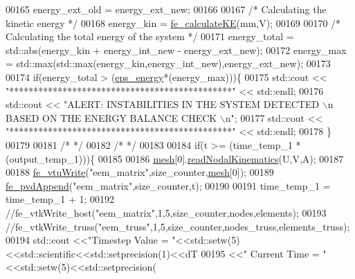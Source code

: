\begin{DoxyCode}
00165                 energy\_ext\_old = energy\_ext\_new;
00166 
00167                 \textcolor{comment}{/* Calculating the kinetic energy */}
00168                 energy\_kin = \hyperlink{functions_8h_afb8a8298008daf8f2e705a9acb72b984}{fe\_calculateKE}(mm,V);
00169 
00170                 \textcolor{comment}{/* Calculating the total energy of the system */}
00171                 energy\_total = std::abs(energy\_kin + energy\_int\_new - energy\_ext\_new);
00172                 energy\_max = std::max(std::max(energy\_kin,energy\_int\_new),energy\_ext\_new);
00173 
00174                 \textcolor{keywordflow}{if}(energy\_total > (\hyperlink{fe__main_e_x_p_l_i_c_i_t_8cpp_a33157279f223d2f4775b0d78b73bc08f}{eps\_energy}*(energy\_max)))\{
00175                     std::cout << \textcolor{stringliteral}{"**********************************************"} << std::endl;
00176                     std::cout << \textcolor{stringliteral}{"ALERT: INSTABILITIES IN THE SYSTEM DETECTED \(\backslash\)n BASED ON THE ENERGY
       BALANCE CHECK \(\backslash\)n"};
00177                     std::cout << \textcolor{stringliteral}{"**********************************************"} << std::endl;
00178                 \}
00179 
00181                 \textcolor{comment}{/* */}
00182                 \textcolor{comment}{/* */}
00183 
00184                 \textcolor{keywordflow}{if}(t >= (time\_temp\_1 * (output\_temp\_1)))\{
00185 
00186                     \hyperlink{_global_variables_8h_a6e08f89b32254fb4b129720418e7c6ea}{mesh}[0].\hyperlink{class_mesh_a2193a797388525febbac794d17bea23e}{readNodalKinematics}(U,V,A);
00187 
00188                     \hyperlink{functions_8h_a9c39148b76d7691ea87e7f2f88b02295}{fe\_vtuWrite}(\textcolor{stringliteral}{"eem\_matrix"},size\_counter,\hyperlink{_global_variables_8h_a6e08f89b32254fb4b129720418e7c6ea}{mesh}[0]);
00189                     \hyperlink{functions_8h_ab350b9dfb65474874d79a92f712078a0}{fe\_pvdAppend}(\textcolor{stringliteral}{"eem\_matrix"},size\_counter,t);
00190 
00191                     time\_temp\_1 = time\_temp\_1 + 1;
00192                     \textcolor{comment}{//fe\_vtkWrite\_host("eem\_matrix",1,5,size\_counter,nodes,elements);}
00193                     \textcolor{comment}{//fe\_vtkWrite\_truss("eem\_truss",1,5,size\_counter,nodes\_truss,elements\_truss);}
00194             std::cout <<\textcolor{stringliteral}{"Timestep Value = "}<<std::setw(5)<<std::scientific<<std::setprecision(1)<<dT
00195                                                     <<\textcolor{stringliteral}{"  Current Time = "}<<std::setw(5)<<std::setprecision(

\end{DoxyCode}
